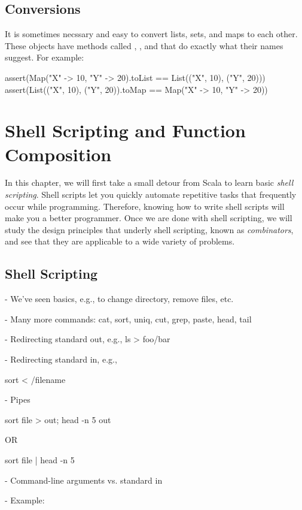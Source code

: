 \documentclass[9pt]{extbook}
\begin{document}
\section{Conversions}

It is sometimes necssary and easy to convert lists, sets, and maps to each
other. These objects have methods called ,
, and  that do exactly what their
names suggest. For example:
%
\begin{scalacode}
assert(Map("X" -> 10, "Y" -> 20).toList == List(("X", 10), ("Y", 20)))
assert(List(("X", 10), ("Y", 20)).toMap == Map("X" -> 10, "Y" -> 20))
\end{scalacode}

\chapter{Shell Scripting and Function Composition}

In this chapter, we will first take a small detour from Scala to learn basic
\emph{shell scripting}. Shell scripts let you quickly automate repetitive tasks
that frequently occur while programming. Therefore, knowing how to write shell
scripts will make you a better programmer. Once we are done with shell
scripting, we will study the design principles that underly shell scripting,
known as \emph{combinators}, and see that they are applicable to a wide variety
of problems.

\section{Shell Scripting}

- We've seen basics, e.g., to change directory, remove files, etc.

- Many more commands: cat, sort, uniq, cut, grep, paste, head, tail

- Redirecting standard out, e.g., ls > foo/bar

- Redirecting standard in, e.g.,

  sort < /filename

- Pipes

  sort file > out; head -n 5 out

   OR

  sort file | head -n 5


- Command-line arguments vs. standard in

- Example:
\end{document}
